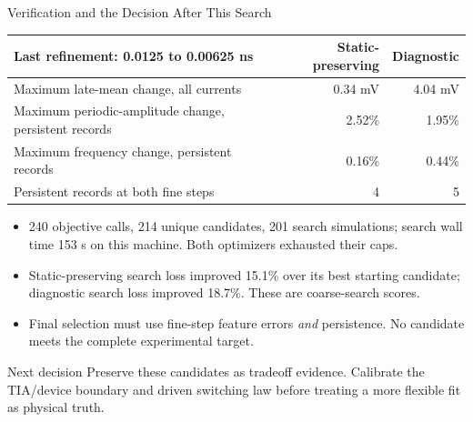 \begin{frame}{Verification and the Decision After This Search}
\footnotesize
\begin{tabular}{lrr}
\toprule
Last refinement: 0.0125 to 0.00625 ns & Static-preserving & Diagnostic \\
\midrule
Maximum late-mean change, all currents & 0.34 mV & 4.04 mV \\
Maximum periodic-amplitude change, persistent records & 2.52\% & 1.95\% \\
Maximum frequency change, persistent records & 0.16\% & 0.44\% \\
Persistent records at both fine steps & 4 & 5 \\
\bottomrule
\end{tabular}
\vspace{0.15cm}
\begin{itemize}
\item 240 objective calls, 214 unique candidates, 201 search simulations;
search wall time 153 s on this machine. Both optimizers exhausted their caps.
\item Static-preserving search loss improved 15.1\% over its best starting
candidate; diagnostic search loss improved 18.7\%. These are coarse-search scores.
\item Final selection must use fine-step feature errors \emph{and} persistence.
No candidate meets the complete experimental target.
\end{itemize}
\begin{block}{Next decision}
Preserve these candidates as tradeoff evidence. Calibrate the TIA/device boundary
and driven switching law before treating a more flexible fit as physical truth.
\end{block}
\end{frame}
